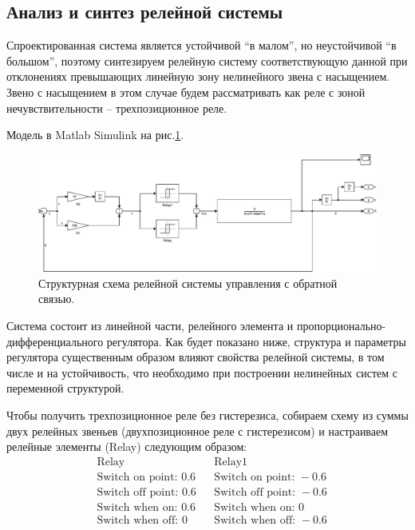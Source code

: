 \subsection{Анализ и синтез релейной системы}
Спроектированная система является устойчивой “в малом”, но неустойчивой “в большом”, поэтому синтезируем релейную систему соответствующую данной при отклонениях превышающих линейную зону нелинейного звена с насыщением. Звено с насыщением в этом случае будем рассматривать как реле с зоной нечувствительности – трехпозиционное реле.

Модель в Matlab Simulink на рис.\ref{fig:sim_relay_system}. 
\begin{figure}[!h]\centering
\includegraphics[width=1.0\linewidth]{images/sim_relay_system}
\caption{Структурная схема релейной системы управления с обратной связью.}\label{fig:sim_relay_system}
\end{figure}

Система состоит из линейной части, релейного элемента и пропорционально-дифференциального регулятора. Как будет показано ниже, структура и параметры регулятора существенным образом влияют свойства релейной системы, в том числе и на устойчивость, что необходимо при построении нелинейных систем с переменной структурой.

Чтобы получить трехпозиционное реле без гистерезиса, собираем схему из суммы двух релейных звеньев (двухпозиционное реле с гистерезисом) и настраиваем релейные элементы (Relay) следующим образом:
\begin{equation}
    \begin{aligned} \label{eq:}
       &\text{Relay} & &\text{Relay1}\\
       &\text{Switch on point: } 0.6 &&\text{Switch on point: } -0.6\\
       &\text{Switch off point: } 0.6 &&\text{Switch off point: } -0.6\\
       &\text{Switch when on: } 0.6 &&\text{Switch when on: } 0\\
       &\text{Switch when off: } 0 &&\text{Switch when off: } -0.6\\
    \end{aligned}
\end{equation}

